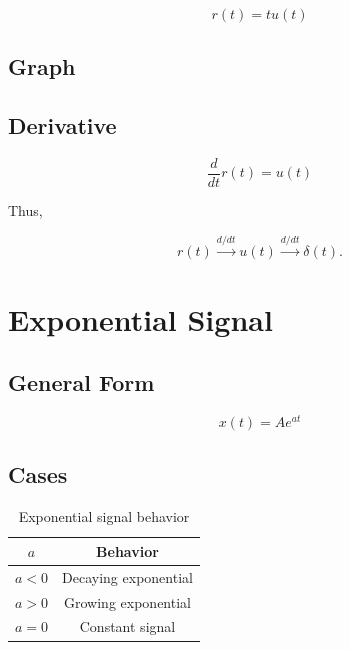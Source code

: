 \[
\boxed{
r(t)=tu(t)
}
\]


\subsection{Graph}

\begin{center}
\end{center}


\subsection{Derivative}

\[
\boxed{
\frac{d}{dt}r(t)=u(t)
}
\]

Thus,

\[
r(t)\xrightarrow{d/dt}u(t)\xrightarrow{d/dt}\delta(t).
\]


\section{Exponential Signal}


\subsection{General Form}

\[
\boxed{
x(t)=Ae^{at}
}
\]


\subsection{Cases}

\begin{table}[H]
\centering
\caption{Exponential signal behavior}
\begin{tabular}{|c|c|}
\hline
\(a\) & Behavior \\
\hline
\(a<0\) & Decaying exponential \\
\hline
\(a>0\) & Growing exponential \\
\hline
\(a=0\) & Constant signal \\
\hline
\end{tabular}
\end{table}

